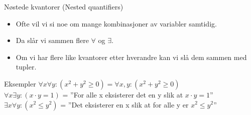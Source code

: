 \begin{frame}{Nøstede kvantorer (Nested quantifiers)}
    \begin{itemize}
        \item Ofte vil vi si noe om mange kombinasjoner av variabler samtidig.
        \item Da slår vi sammen flere $\forall$ og $\exists$.
        \item Om vi har flere like kvantorer etter hverandre kan vi slå dem sammen med tupler.
    \end{itemize}
    
    \pause
    \begin{block}{Eksempler}
        $\forall x \forall y : (x^2 + y^2 \geq 0) = \forall x, y : (x^2 + y^2 \geq 0)$ \\
        \pause
        $\forall x \exists y : (x \cdot y = 1)$ = ''For alle x eksisterer det en y slik at $x \cdot y = 1$'' \\
        \pause
        $\exists x \forall y : (x^2 \leq y^2)$ = ''Det eksisterer en x slik at for alle y er $x^2 \leq y^2$''\\
    \end{block}
\end{frame}

